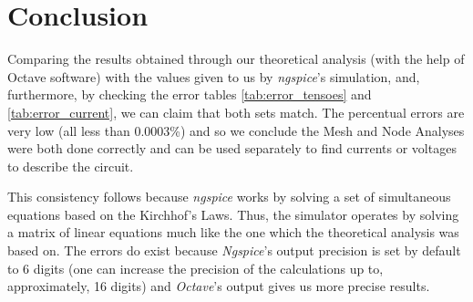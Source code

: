 \section{Conclusion}
\label{sec:conclusion}

Comparing the results obtained through our theoretical analysis (with the help of Octave
software) with the values given to us by \emph{ngspice}'s simulation, and, furthermore, by checking the
error tables \ref{tab:error_tensoes} and \ref{tab:error_current}, we can claim that both sets match. The percentual
errors are very low (all less than 0.0003\%) and so we conclude the Mesh and Node Analyses were both done
correctly and can be used separately to find currents or voltages to describe the circuit.

\par

This consistency follows because \emph{ngspice} works by solving a set of simultaneous equations
based on the Kirchhof's Laws. Thus, the simulator operates by solving a matrix of linear equations much
like the one which the theoretical analysis was based on. The errors do exist because \emph{Ngspice}'s output
precision is set by default to 6 digits (one can increase the precision of the calculations up to, approximately,
16 digits) and \emph{Octave}'s output gives us more precise results.
